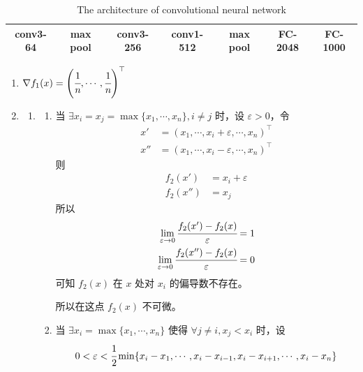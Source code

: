 \documentclass[11pt,letter,notitlepage]{article}
\begin{document}
\begin{table}[h]
	\centering
	\begin{tabular}{|c|c|c|c|c|c|c|}
		\hline
		conv3-64 & max pool & conv3-256 & conv1-512 & max pool & FC-2048 & FC-1000 \\
		\hline
	\end{tabular}
	\caption{The architecture of convolutional neural network} \label{tab:cnn}
\end{table}
\begin{solution}
	\begin{enumerate}
		\item $\nabla f_1(x) = \left( \cfrac{1}{n}, \cdots, \cfrac{1}{n} \right)^\top$
		\item \begin{enumerate}
			      \item \begin{enumerate}
				            \item 当 $\exists x_i=x_j=\max\{x_1,\cdots,x_n\} ,i\neq j$ 时，设 $\varepsilon>0$，令
				                  $$\begin{aligned}
						                  x'  & = \left( x_1,\cdots,x_i+\varepsilon,\cdots,x_n \right)^\top \\
						                  x'' & = \left( x_1,\cdots,x_i-\varepsilon,\cdots,x_n \right)^\top
					                  \end{aligned}$$
				                  则
				                  $$\begin{aligned}
						                  f_2(x')  & = x_i+\varepsilon \\
						                  f_2(x'') & = x_j
					                  \end{aligned}$$
				                  所以
				                  $$\begin{aligned}
						                  \lim_{\varepsilon\to0} \cfrac{f_2(x')-f_2(x)}{\varepsilon}  & =1 \\
						                  \lim_{\varepsilon\to0} \cfrac{f_2(x'')-f_2(x)}{\varepsilon} & =0
					                  \end{aligned}$$
				                  可知 $f_2(x)$ 在 $x$ 处对 $x_i$ 的偏导数不存在。

				                  所以在这点 $f_2(x)$ 不可微。
				            \item 当 $\exists x_i=\max\{x_1,\cdots,x_n\}$ 使得 $\forall j\neq i, x_j <x_i$ 时，设
				                  $$0<\varepsilon<\cfrac{1}{2}\min\{x_i-x_1,\cdots,x_i-x_{i-1},x_i-x_{i+1},\cdots,x_i-x_n\}$$


\end{enumerate}
\end{enumerate}
\end{enumerate}
\end{solution}
\end{document}
